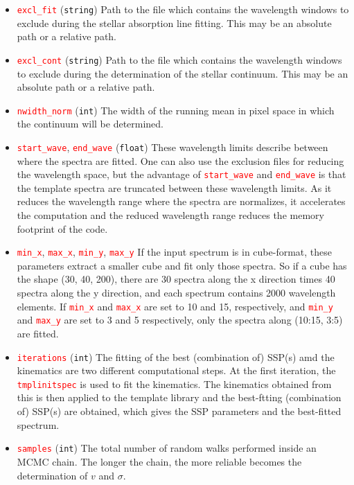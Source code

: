 \documentclass[usenatbib,usegraphicx,useAMS,onecolumn]{mn2e}
\newcommand{\codeline}[1]{\lstinline|#1|}
\newcommand{\paramdef}[1]{\textcolor{red}{\codeline{#1}}}
\begin{document}
\begin{itemize}
    \item \paramdef{excl_fit} (\texttt{string})
        Path to the file which contains the wavelength windows to exclude during the stellar absorption line fitting.
        This may be an absolute path or a relative path.
    \item \paramdef{excl_cont} (\texttt{string})
        Path to the file which contains the wavelength windows to exclude during the determination of the stellar continuum.
        This may be an absolute path or a relative path.
    \item \paramdef{nwidth_norm} (\texttt{int})
        The width of the running mean in pixel space in which the continuum will be determined.
    \item \paramdef{start_wave}, \paramdef{end_wave} (\texttt{float})
        These wavelength limits describe between where the spectra are fitted.
        One can also use the exclusion files for reducing the wavelength space, but the advantage of \paramdef{start_wave} and \paramdef{end_wave} is that the template spectra are truncated between these wavelength limits.
        As it reduces the wavelength range where the spectra are normalizes, it accelerates the computation and the reduced wavelength range reduces the memory footprint of the code.
    \item \paramdef{min_x}, \paramdef{max_x}, \paramdef{min_y}, \paramdef{max_y}
        If the input spectrum is in cube-format, these parameters extract a smaller cube and fit only those spectra.
        So if a cube has the shape (30, 40, 200), there are 30 spectra along the x direction times 40 spectra along the y direction, and each spectrum contains 2000 wavelength elements.
        If \paramdef{min_x} and \paramdef{max_x} are set to 10 and 15, respectively, and \paramdef{min_y} and \paramdef{max_y} are set to 3 and 5 respectively, only the spectra along (10:15, 3:5) are fitted.
    \item \paramdef{iterations} (\texttt{int})
        The fitting of the best (combination of) SSP(s) amd the kinematics are two different computational steps.
        At the first iteration, the \paramdef{tmplinitspec} is used to fit the kinematics.
        The kinematics obtained from this is then applied to the template library and the best-ftting (combination of) SSP(s) are obtained, which gives the SSP parameters and the best-fitted spectrum.
    \item \paramdef{samples} (\texttt{int})
        The total number of random walks performed inside an MCMC chain. 
        The longer the chain, the more reliable becomes the determination of $v$ and $\sigma$. 

\end{itemize}
\end{document}

